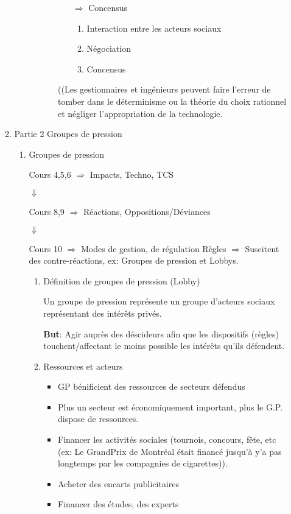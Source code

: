 \documentclass[11pt]{article}
\begin{document}
\begin{enumerate}
\begin{enumerate}
\begin{enumerate}
\begin{enumerate}
\begin{enumerate}
\begin{enumerate}
\(\Rightarrow\) Concensus

\begin{enumerate}
\item Interaction entre les acteurs sociaux
\item Négociation
\item Concensus
\end{enumerate}
\end{enumerate}

((Les gestionnaires et ingénieurs peuvent faire l'erreur de tomber dans le
déterminisme ou la théorie du choix rationnel et négliger l'appropriation de la technologie.
\end{enumerate}
\end{enumerate}
\end{enumerate}


\item Partie 2 Groupes de pression
\label{sec:orgdec96fc}

\begin{enumerate}
\item Groupes de pression
\label{sec:orga2e0f34}

Cours 4,5,6 \(\Rightarrow\) Impacts, Techno, TCS

\(\Downarrow\)

Cours 8,9 \(\Rightarrow\) Réactions, Oppositions/Déviances

\(\Downarrow\)

Cours 10 \(\Rightarrow\)  Modes de gestion, de régulation Règles \(\Rightarrow\) Suscitent des
contre-réactions, ex: Groupes de pression et Lobbys.

\begin{enumerate}
\item Définition de groupes de pression (Lobby)
\label{sec:orgfff7f53}

Un groupe de pression représente un groupe d'acteurs sociaux représentant des
intérêts privés.

\textbf{But}: Agir auprès des déscideurs afin que les dispositifs (règles)
touchent/affectant le moins possible les intérêts qu'ils défendent.

\item Ressources et acteurs
\label{sec:org70be5e5}

\begin{itemize}
\item GP bénificient des ressources de secteurs défendus
\item Plus un secteur est économiquement important, plus le G.P. dispose de
ressources.
\item Financer les activités sociales (tournois, concours, fête, etc (ex: Le
GrandPrix de Montréal était financé jusqu'à y'a pas longtemps par les
compagnies de cigarettes)).
\item Acheter des encarts publicitaires
\item Financer des études, des experts
\end{itemize}


\end{enumerate}
\end{enumerate}
\end{enumerate}
\end{enumerate}
\end{document}
